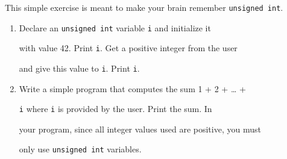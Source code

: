 This simple exercise is meant to make your brain remember \texttt{unsigned int}.



\begin{enumerate}

\item

  Declare an \texttt{unsigned int} variable \texttt{i} and initialize it

  with value 42. Print \texttt{i}. Get a positive integer from the user

  and give this value to \texttt{i}. Print \texttt{i}.

\item

  Write a simple program that computes the sum 1 + 2 + \ldots{} +

  \texttt{i} where \texttt{i} is provided by the user. Print the sum. In

  your program, since all integer values used are positive, you must

  only use \texttt{unsigned int} variables.

\end{enumerate}

